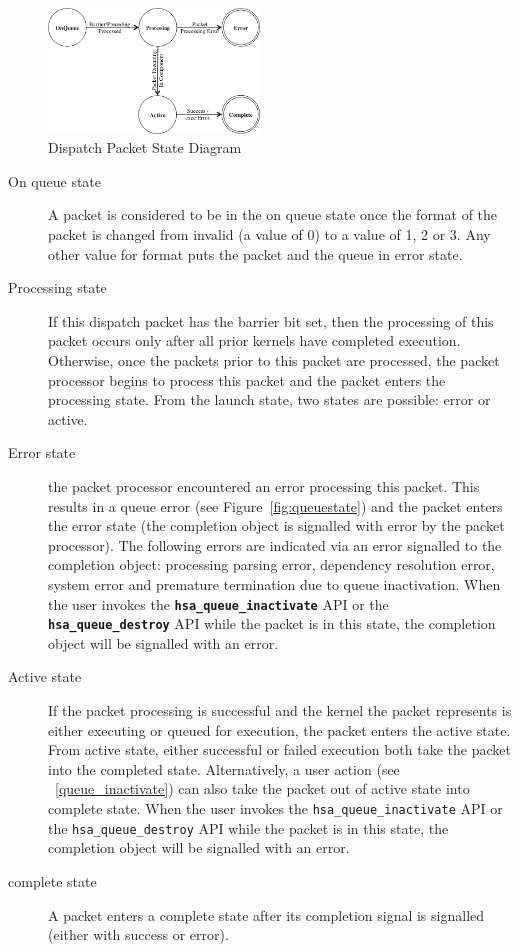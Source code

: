 \documentclass{book}
\newcommand{\diffblock}[1]{#1}
\newcommand{\ttbf}[1]{\diffblock{\texttt{\textbf{#1}}}}
\begin{document}
\begin{figure}
  \centering
  \includegraphics[width=0.5\textwidth] {fig/packetstate}
  \centering
  \caption{Dispatch Packet State Diagram}
  \label{fig:packetstate}
\end{figure}

\begin{description}
\item[On queue state] A packet is considered to be in the on queue
state once the format of the packet is changed from invalid (a value
of 0) to a value of 1, 2 or 3. Any other value for format puts the
packet and the queue in error state.

\item[Processing state] If this dispatch packet has the barrier bit
set, then the processing of this packet occurs only after all prior
kernels have completed execution.  Otherwise, once the packets prior
to this packet are processed, the packet processor begins to process
this packet and the packet enters the processing state.  From the
launch state, two states are possible: error or active.

\item[Error state] the packet processor encountered an error
processing this packet. This results in a queue error (see
Figure~\ref{fig:queuestate}) and the packet enters the error state
(the completion object is signalled with error by the packet
processor). The following errors are indicated via an error signalled
to the completion object:
processing parsing error, dependency resolution error, system error
and premature termination due to queue inactivation.
When the user invokes the
\ttbf{hsa\_queue\_inactivate} API or the
\ttbf{hsa\_queue\_destroy} API while the packet is in this state, the
completion object will be signalled with an error.

\item[Active state] If the packet processing is successful and the
kernel the packet represents is either executing or queued for
execution, the packet enters the active state. From active state,
either successful or failed execution both take the packet into the
completed state.  Alternatively, a user action (see
~\ref{queue_inactivate}) can also take the packet out of
active state into complete state.  When the user invokes the
\texttt{hsa\_queue\_inactivate} API or the
\texttt{hsa\_queue\_destroy} API while the packet is in this state, the
completion object will be signalled with an error.

\item[complete state] A packet enters a complete state after its
completion signal is signalled (either with success or error).
\end{description}
\end{document}
